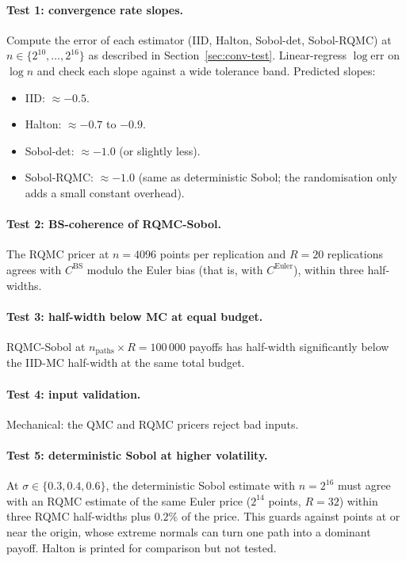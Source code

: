 \documentclass[11pt,a4paper]{article}
\theoremstyle{plain}
\theoremstyle{definition}
\theoremstyle{remark}
\begin{document}
\paragraph{Test 1: convergence rate slopes.} Compute the error of
each estimator (IID, Halton, Sobol-det, Sobol-RQMC) at
$n \in \{2^{10}, \ldots, 2^{16}\}$ as described in
Section~\ref{sec:conv-test}. Linear-regress $\log \mathrm{err}$ on
$\log n$ and check each slope against a wide tolerance band. Predicted
slopes:
\begin{itemize}
\item IID: $\approx -0.5$.
\item Halton: $\approx -0.7$ to $-0.9$.
\item Sobol-det: $\approx -1.0$ (or slightly less).
\item Sobol-RQMC: $\approx -1.0$ (same as deterministic Sobol; the
randomisation only adds a small constant overhead).
\end{itemize}

\paragraph{Test 2: BS-coherence of RQMC-Sobol.} The RQMC pricer at
$n = 4096$ points per replication and $R = 20$ replications agrees
with $C^{\mathrm{BS}}$ modulo the Euler bias (that is, with
$C^{\mathrm{Euler}}$), within three half-widths.

\paragraph{Test 3: half-width below MC at equal budget.} RQMC-Sobol
at $n_{\text{paths}} \times R = 100\,000$ payoffs has half-width
significantly below the IID-MC half-width at the same total budget.

\paragraph{Test 4: input validation.} Mechanical: the QMC and RQMC
pricers reject bad inputs.

\paragraph{Test 5: deterministic Sobol at higher volatility.} At
$\sigma \in \{0.3, 0.4, 0.6\}$, the deterministic Sobol estimate with
$n = 2^{16}$ must agree with an RQMC estimate of the same Euler price
($2^{14}$ points, $R = 32$) within three RQMC half-widths plus
$0.2\%$ of the price. This guards against points at or near the origin, whose
extreme normals can turn one path into a dominant payoff. Halton is
printed for comparison but not tested.
\end{document}
